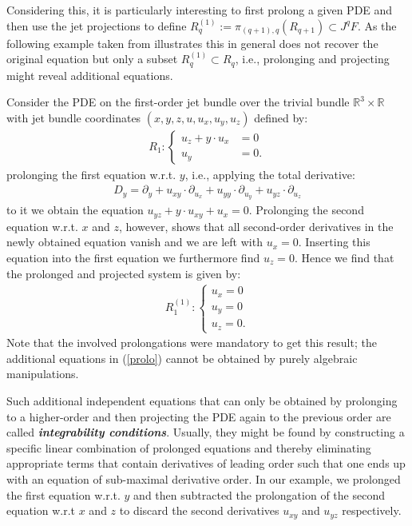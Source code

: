 Considering this, it is particularly interesting to first prolong a given PDE and then use the jet projections to define $R_q^{(1)} := \pi_{(q+1),q}\left ( R_{q+1} \right ) \subset J^qF $. As the following example taken from \cite{seiler1994analysis} illustrates this in general does not recover the original equation but only a subset $R_q^{(1)} \subset R_q$, i.e., prolonging and projecting might reveal additional equations.
\begin{example}\label{ExamplePDE}
Consider the PDE on the first-order jet bundle over the trivial bundle $\mathbb{R}^3 \times \mathbb{R}$ with jet bundle  coordinates $(x,y,z,u,u_x,u_y,u_z)$ defined by: 
\begin{align}
    R_1 : \begin{cases} u_z + y \cdot u_x &= 0 \\
                        u_y &= 0.
            \end{cases}
\end{align}
prolonging the first equation w.r.t. $y$, i.e., applying the total derivative: 
\begin{align}
D_y = \partial_y + u_{xy} \cdot \partial_{u_x} + u_{yy} \cdot \partial_{u_y} + u_{yz} \cdot \partial_{u_z}
\end{align}
to it we obtain the equation $u_{yz} + y \cdot u_{xy} + u_x =0$. Prolonging the second equation w.r.t. $x$ and $z$, however, shows that all second-order derivatives in the newly obtained equation vanish and we are left with $u_x = 0$. Inserting this equation into the first equation we furthermore find $u_z = 0$. Hence we find that the prolonged and projected system is given by: 
\begin{align}\label{prolo}
    R_1^{(1)} : \begin{cases} u_x = 0 \\
                        u_y = 0\\
                        u_z = 0 .
            \end{cases}
\end{align}
Note that the involved prolongations were mandatory to get this result; the additional equations in (\ref{prolo})  cannot be obtained by purely algebraic manipulations. 
\end{example}
Such additional independent equations that can only be obtained by prolonging to a higher-order and then projecting the PDE again to the previous order are called \textit{\textbf{integrability conditions}}. 
Usually, they might be found by constructing a specific linear combination of prolonged equations and thereby eliminating appropriate terms that contain derivatives of leading order such that one ends up with an equation of sub-maximal derivative order. In our example, we prolonged the first equation w.r.t. $y$ and then subtracted the prolongation of the second equation w.r.t $x$ and $z$ to discard the second derivatives $u_{xy}$ and $u_{yz}$ respectively. 

